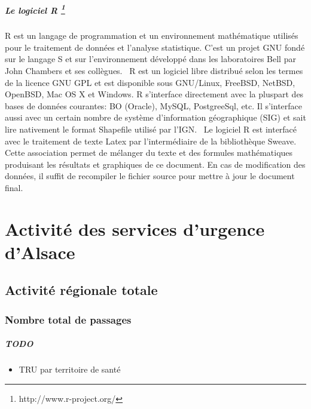 \documentclass[12pt,english,french,twoside]{report}\usepackage[]{graphicx}\usepackage[]{color}
\begin{document}
\subsubsection*{Le logiciel R \footnote{http://www.r-project.org/}}

R est un langage de programmation et un environnement mathématique utilisés pour le traitement de données et l'analyse statistique. C'est un projet GNU fondé sur le langage S et sur l'environnement développé dans les laboratoires Bell par John Chambers et ses collègues. 
\
R est un logiciel libre distribué selon les termes de la licence GNU GPL et est disponible sous GNU/Linux, FreeBSD, NetBSD, OpenBSD, Mac OS X et Windows. R s'interface directement avec la pluspart des bases de données courantes: BO (Oracle), MySQL, PostgreeSql, etc. Il s'interface aussi avec un certain nombre de système d'information géographique (SIG) et sait lire nativement le format Shapefile utilisé par l'IGN.
\
Le logiciel R est interfacé avec le traitement de texte Latex par l'intermédiaire de la bibliothèque Sweave. Cette association permet de mélanger du texte et des formules mathématiques produisant les résultats et graphiques de ce document. En cas de modification des données, il suffit de recompiler le fichier source pour mettre à jour le document final.


\part{Activité des services d'urgence d'Alsace}
\chapter{Activité régionale totale}
\section{Nombre total de passages}

\subsubsection*{TODO}
\begin{itemize}
  \item TRU par territoire de santé
\end{itemize}

\end{document}
